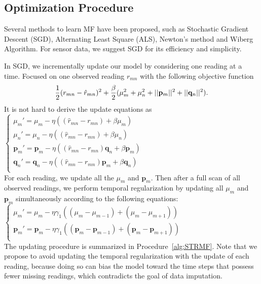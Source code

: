 \subsection{Optimization Procedure}
\label{optimation_procedure}
Several methods to learn MF have been proposed, such as Stochastic Gradient Descent (SGD)\cite{koren2009matrix,chih2008large}, Alternating Least Square (ALS)\cite{koren2009matrix,zhou2008large}, Newton's method\cite{buchanan2005damped} and Wiberg Algorithm\cite{okatani2007wiberg}.
For sensor data, we suggest SGD for its efficiency and simplicity. 

In SGD, we incrementally update our model by considering one reading at a time.
Focused on one observed reading $r_{mn}$ with the following objective function
\begin{equation*} \small \frac{1}{2}(r_{mn} - \hat{r}_{mn})^2
+ \frac{\beta}{2}(\mu_m^2 + \mu_n^2 + ||\mathbf{p}_m||^2 + ||\mathbf{q}_n||^2).\end{equation*}
It is not hard to derive the update equations as \\
\indent	$ \begin{cases} 
	\mu_m' = \mu_m - \eta ((\hat{r}_{mn}-r_{mn}) + \beta \mu_m) \\
	\mu_n' = \mu_n - \eta ((\hat{r}_{mn}-r_{mn}) + \beta \mu_n) \\
	\mathbf{p}_{m}' = \mathbf{p}_{m} - \eta ((\hat{r}_{mn}-r_{mn})\mathbf{q}_{n} + \beta \mathbf{p}_{m})\\
	\mathbf{q}_{n}' = \mathbf{q}_{n} - \eta ((\hat{r}_{mn}-r_{mn})\mathbf{p}_{m} + \beta \mathbf{q}_{n})\\
	\end{cases} $ \\
For each reading, we update all the $\mu_m$ and $\mathbf{p}_m$. Then after a full scan of all observed readings, 
we perform temporal regularization by updating all $\mu_m$ and $\mathbf{p}_m$ simultaneously according to the following equations:\\
\indent $ \begin{cases}
	\mu_m' = \mu_m - \eta \gamma_1((\mu_m-\mu_{m-1})+(\mu_m-\mu_{m+1}))\\
	\mathbf{p}_{m}' = \mathbf{p}_{m} - \eta \gamma_1((\mathbf{p}_{m}-\mathbf{p}_{m-1})+(\mathbf{p}_{m}-\mathbf{p}_{m+1}))\\
	\end{cases} $\\
The updating procedure is summarized in Procedure~\ref{alg:STRMF}. Note that we propose to avoid updating the temporal regularization with the update of each reading, because doing so can bias the model toward the time steps that possess fewer missing readings, which contradicts the goal of data imputation. 


